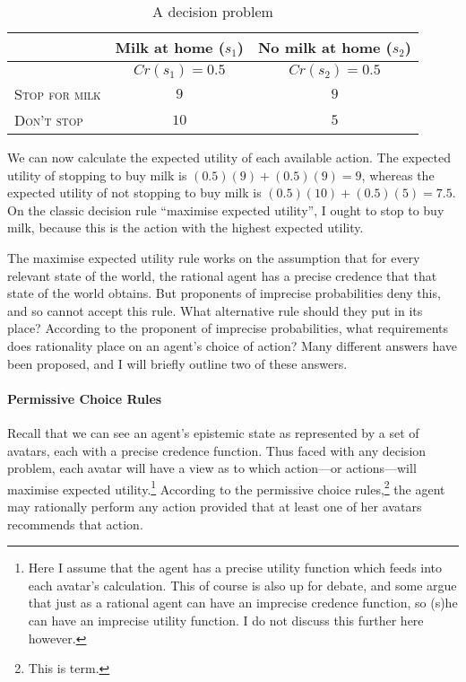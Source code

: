 \begin{table}
\centering
  \begin{tabular}{lcc}
  \hline
    & Milk at home ($s_1$) & No milk at home  ($s_2$)\\\hline\hline
    & $Cr(s_1)=0.5$ & $Cr(s_2)=0.5$ \\
    \textsc{Stop for milk} & $9$ & $9$ \\
    \textsc{Don't stop} & $10$ & $5$\\
  \hline
  \end{tabular}
\caption{A decision problem}
\label{mahtani:table1}
\end{table}

We can now calculate the expected utility of each available action. The expected utility of stopping to buy milk is $(0.5)(9) + (0.5)(9) = 9$, whereas the expected utility of not stopping to buy milk is $(0.5)(10) + (0.5)(5) = 7.5$. On the classic decision rule ``maximise expected utility'', I ought to stop to buy milk, because this is the action with the highest expected utility. 

The maximise expected utility rule works on the assumption that for every relevant state of the world, the rational agent has a precise credence that that state of the world obtains. But proponents of imprecise probabilities deny this, and so cannot accept this rule. What alternative rule should they put in its place? According to the proponent of imprecise probabilities, what requirements does rationality place on an agent's choice of action? Many different answers have been proposed, and I will briefly outline two of these answers.

\paragraph{Permissive Choice Rules} Recall that we can see an agent's epistemic state as represented by a set of avatars, each with a precise credence function. Thus faced with any decision problem, each avatar will have a view as to which action---or actions---will maximise expected utility.\footnote{Here I assume that the agent has a precise utility function which feeds into each avatar's calculation. This of course is also up for debate, and some argue that just as a rational agent can have an imprecise credence function, so (s)he can have an imprecise utility function. I do not discuss this further here however.} According to the permissive choice rules,\footnote{This is  term.} the agent may rationally perform any action provided that at least one of her avatars recommends that action. 

